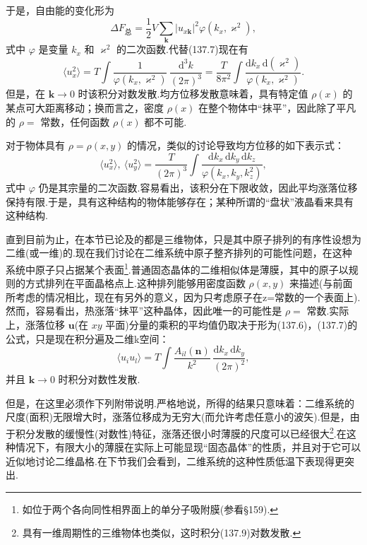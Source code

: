 于是，自由能的变化形为
\begin{equation}
  \Delta F_{\text{总}}=\frac{1}{2}V\sum_{\boldsymbol{k}}
  |u_{x\boldsymbol{k}}|^2\varphi(k_x,\varkappa^2),
\end{equation}
式中 $\varphi$ 是变量 $k_x$ 和 $\varkappa^2$ 的二次函数.代替(137.7)现在有
\begin{equation}
  \langle u_x^2\rangle=T\int\frac{1}{\varphi(k_x,\varkappa^2)}\,
  \frac{\mathrm{d}^3k}{(2\pi)^3}
  =\frac{T}{8\pi^2}\int\frac{\mathrm{d}k_x\,\mathrm{d}(\varkappa^2)}
  {\varphi(k_x,\varkappa^2)}.
\end{equation}
但是，在 $\boldsymbol{k}\to0$ 时该积分对数发散.均方位移发散意味着，具有特定值 $\rho(x)$ 的某点可大距离移动；换而言之，密度 $\rho(x)$ 在整个物体中“抹平”，因此除了平凡的 $\rho=$ 常数，任何函数 $\rho(x)$ 都不可能.

对于物体具有 $\rho=\rho(x,y)$ 的情况，类似的讨论导致均方位移的如下表示式：
\begin{equation}
  \langle u_x^2\rangle,\ \langle u_y^2\rangle
  =\frac{T}{(2\pi)^3}\int
  \frac{\mathrm{d}k_x\,\mathrm{d}k_y\,\mathrm{d}k_z}
  {\varphi(k_x,k_y,k_z^2)},
\end{equation}
式中 $\varphi$ 仍是其宗量的二次函数.容易看出，该积分在下限收敛，因此平均涨落位移保持有限.于是，具有这种结构的物体能够存在；某种所谓的“盘状”液晶看来具有这种结构.

直到目前为止，在本节已论及的都是三维物体，只是其中原子排列的有序性设想为二维(或一维)的.现在我们讨论在二维系统中原子整齐排列的可能性问题，在这种系统中原子只占据某个表面\footnote{如位于两个各向同性相界面上的单分子吸附膜(参看§159).}.普通固态晶体的二维相似体是薄膜，其中的原子以规则的方式排列在平面晶格点上.这种排列能够用密度函数 $\rho(x,y)$ 来描述(与前面所考虑的情况相比，现在有另外的意义，因为只考虑原子在z=常数的一个表面上).然而，容易看出，热涨落“抹平”这种晶体，因此唯一的可能性是 $\rho=$ 常数.实际上，涨落位移 $\boldsymbol{u}$(在 $xy$ 平面)分量的乘积的平均值仍取决于形为(137.6)，(137.7)的公式，只是现在积分遍及二维k空间：
\begin{equation}
  \langle u_iu_l\rangle=T\int\frac{A_{il}(\boldsymbol{n})}{k^2}\,
  \frac{\mathrm{d}k_x\,\mathrm{d}k_y}{(2\pi)^2},
\end{equation}
并且 $\boldsymbol{k}\to0$ 时积分对数性发散.

但是，在这里必须作下列附带说明.严格地说，所得的结果只意味着：二维系统的尺度(面积)无限增大时，涨落位移成为无穷大(而允许考虑任意小的波矢).但是，由于积分发散的缓慢性(对数性)特征，涨落还很小时薄膜的尺度可以已经很大\footnote{具有一维周期性的三维物体也类似，这时积分(137.9)对数发散.}.在这种情况下，有限大小的薄膜在实际上可能显现“固态晶体”的性质，并且对于它可以近似地讨论二维晶格.在下节我们会看到，二维系统的这种性质低温下表现得更突出.

